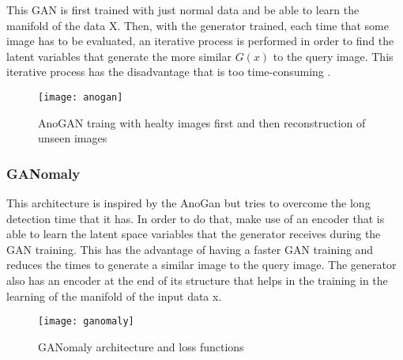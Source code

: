 This GAN is first trained with just normal data and be able to learn the manifold of the data X. Then, with the generator trained, each time that some image has to be evaluated, an iterative process is performed in order to find the latent variables that generate the more similar \begin{math}G(x)\end{math} to the query image. This iterative process has the disadvantage that is too time-consuming \cite{Schlegl2017}.

\begin{figure}[htb]
  \centering
  \texttt{[image: anogan]}
  \caption[AnoGAN]{AnoGAN traing with healty images first and then reconstruction of unseen images\cite{Schlegl2017}}
  \label{fig:anogan}
\end{figure}

\subsubsection{GANomaly}

This architecture is inspired by the AnoGan but tries to overcome the long detection time that it has. In order to do that, make use of an encoder that is able to learn the latent space variables that the generator receives during the GAN training. This has the advantage of having a faster GAN training and reduces the times to generate a similar image to the query image. The generator also has an encoder at the end of its structure that helps in the training in the learning of the manifold of the input data x.

\begin{figure}[htb]
  \centering
  \texttt{[image: ganomaly]}
  \caption[GANomaly]{GANomaly architecture and loss functions \cite{DiMattia2019}}
  \label{fig:ganomaly}
\end{figure}
